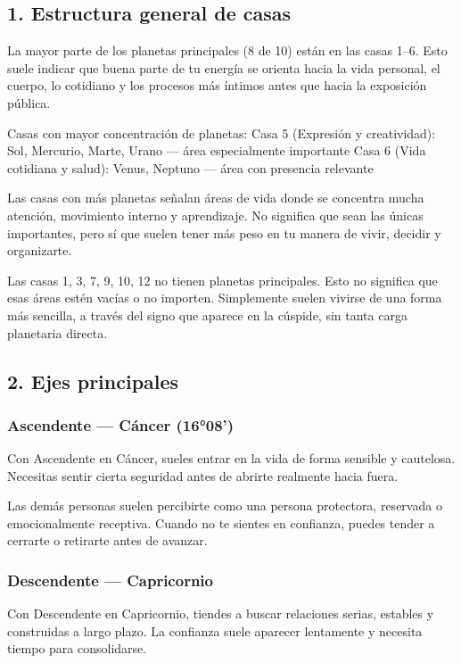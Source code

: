 \documentclass[11pt,a4paper]{article}
\begin{document}
\subsection{1. Estructura general de casas}

La mayor parte de los planetas principales (8 de 10) están en las casas 1–6. Esto suele indicar que buena parte de tu energía se orienta hacia la vida personal, el cuerpo, lo cotidiano y los procesos más íntimos antes que hacia la exposición pública.

Casas con mayor concentración de planetas:
Casa 5 (Expresión y creatividad): Sol, Mercurio, Marte, Urano — área especialmente importante
Casa 6 (Vida cotidiana y salud): Venus, Neptuno — área con presencia relevante

Las casas con más planetas señalan áreas de vida donde se concentra mucha atención, movimiento interno y aprendizaje. No significa que sean las únicas importantes, pero sí que suelen tener más peso en tu manera de vivir, decidir y organizarte.

Las casas 1, 3, 7, 9, 10, 12 no tienen planetas principales. Esto no significa que esas áreas estén vacías o no importen. Simplemente suelen vivirse de una forma más sencilla, a través del signo que aparece en la cúspide, sin tanta carga planetaria directa.

\vspace{0.5cm}

\subsection{2. Ejes principales}

\subsubsection*{Ascendente — Cáncer (16°08')}
Con Ascendente en Cáncer, sueles entrar en la vida de forma sensible y cautelosa. Necesitas sentir cierta seguridad antes de abrirte realmente hacia fuera.

Las demás personas suelen percibirte como una persona protectora, reservada o emocionalmente receptiva. Cuando no te sientes en confianza, puedes tender a cerrarte o retirarte antes de avanzar.

\subsubsection*{Descendente — Capricornio}
Con Descendente en Capricornio, tiendes a buscar relaciones serias, estables y construidas a largo plazo. La confianza suele aparecer lentamente y necesita tiempo para consolidarse.
\end{document}
